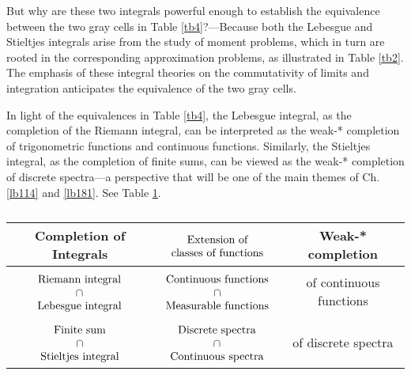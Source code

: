 \documentclass[12pt,b5paper,notitlepage]{article}
\theoremstyle{definition}
\theoremstyle{plain}
\numberwithin{equation}{section}
\begin{document}
But why are these two integrals powerful enough to establish the equivalence between the two gray cells in Table \ref{tb4}?—Because both the Lebesgue and Stieltjes integrals arise from the study of moment problems, which in turn are rooted in the corresponding approximation problems, as illustrated in Table \ref{tb2}. The emphasis of these integral theories on the commutativity of limits and integration anticipates the equivalence of the two gray cells.

In light of the equivalences in Table \ref{tb4}, the Lebesgue integral, as the completion of the Riemann integral, can be interpreted as the weak-* completion of trigonometric functions and continuous functions. Similarly, the Stieltjes integral, as the completion of finite sums, can be viewed as the weak-* completion of discrete spectra---a perspective that will be one of the main themes of Ch. \ref{lb114} and \ref{lb181}. See Table \ref{tb3}.







\begin{table}[H]
\centering
 \begin{tabular}{|c|c|c|}
    \hline 
Completion of Integrals &$\begin{array}{c}
\rule{0pt}{0.45cm}\text{Extension of} \\
\text{classes of functions}
\end{array}$  & \textbf{Weak-* completion}\\
\hline 
$\begin{array}{c}
\rule{0pt}{0.45cm}\text{Riemann integral} \\
\cap\\
\text{Lebesgue integral}
\end{array}$
& 
$\begin{array}{c}
\rule{0pt}{0.45cm}\text{Continuous functions} \\
\cap\\
\text{Measurable functions}
\end{array}$
 & of continuous functions\\
\hline 
$\begin{array}{c}
\rule{0pt}{0.45cm}\text{Finite sum} \\
\cap\\
\text{Stieltjes integral}
\end{array}$
& 
$\begin{array}{c}
\rule{0pt}{0.45cm}\text{Discrete spectra} \\
\cap\\
\text{Continuous spectra}
\end{array}$
 & of discrete spectra\\
\hline
  \end{tabular}
\caption{}\label{tb3}
\end{table}
\end{document}
